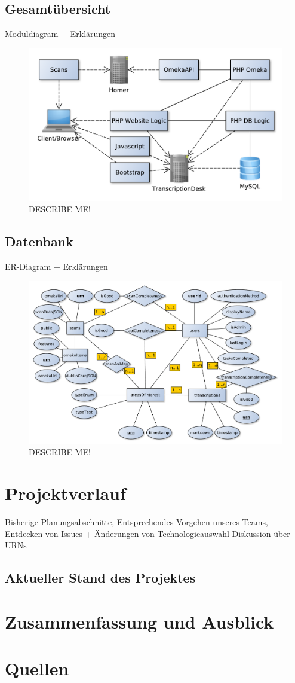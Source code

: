 \documentclass{article}
\begin{document}
\subsection{Gesamtübersicht}
Moduldiagram + Erklärungen
\\\begin{figure}
\includegraphics[width=\textwidth]{../notes/components.pdf}
\caption{DESCRIBE ME!}
\label{fig:components}
\end{figure}
\subsection{Datenbank}
ER-Diagram + Erklärungen
\\\begin{figure}
\includegraphics[width=\textwidth]{../notes/ER.pdf}
\caption{DESCRIBE ME!}
\label{fig:er}
\end{figure}
\section{Projektverlauf}
Bisherige Planungsabschnitte,
Entsprechendes Vorgehen unseres Teams,
Entdecken von Issues + Änderungen von Technologieauswahl
Diskussion über URNs
\subsection{Aktueller Stand des Projektes}
\section{Zusammenfassung und Ausblick}
\section*{Quellen}

\nocite{*}

\end{document}
